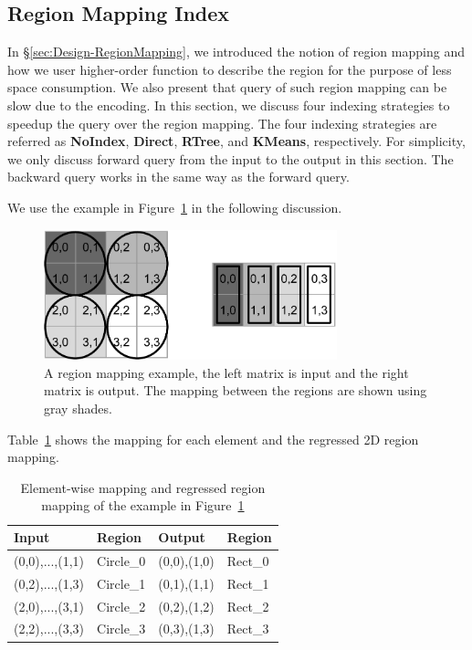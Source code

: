\documentclass{sig-alternate}
\begin{document}
\subsection{Region Mapping Index}
\label{sec:RegionIndex}
In \S\ref{sec:Design-RegionMapping}, we introduced the notion of region mapping and how we user higher-order function
to describe the region for the purpose of less space consumption. We also present that query of such region mapping
can be slow due to the encoding. 
In this section, we discuss four indexing strategies to speedup the query over the region mapping. 
The four indexing strategies are referred as {\bf NoIndex}, {\bf Direct}, {\bf RTree}, and {\bf KMeans}, respectively.
For simplicity, we only discuss forward query from the input to the output in this section.
The backward query works in the same way as the forward query.


We use the example in Figure~\ref{fig:example} in the following discussion.
\begin{figure}[h]
\begin{center}
    \includegraphics[width=85mm]{pictures/example}
\caption {A region mapping example, the left matrix is input and the right matrix is output. The mapping between the regions are shown using gray shades.
    \label{fig:example}
}
\end{center}
\end{figure}

Table~\ref{tb:example} shows the mapping for each element and the regressed 2D region mapping.
\begin{table}[ht]
\begin{center}
    \caption{Element-wise mapping and regressed region mapping of the example in Figure~\ref{fig:example}}
    \begin{scriptsize}
    \begin{tabular}{ | p{1.75cm} | p{1.75cm} | p{1.75cm} | p{1.75cm} |}
    \hline
    Input & Region & Output & Region \\ \hline \hline
    (0,0),...,(1,1) & Circle\_0 & (0,0),(1,0) & Rect\_0 \\ \hline
    (0,2),...,(1,3) & Circle\_1 & (0,1),(1,1) & Rect\_1 \\ \hline
    (2,0),...,(3,1) & Circle\_2 & (0,2),(1,2) & Rect\_2 \\ \hline
    (2,2),...,(3,3) & Circle\_3 & (0,3),(1,3) & Rect\_3 \\ \hline
    \end{tabular}
    \end{scriptsize}
    \label{tb:example}
\end{center}   
\end{table} 
\end{document}
